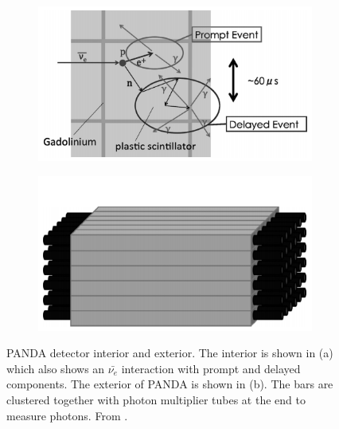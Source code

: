 \begin{figure}[!h]
\centering
\begin{subfigure}{.5\textwidth}
  \centering
\includegraphics[width=\linewidth]{Chapter2/Figs/Raster/Panda_close.png}
  \captionsetup{width=.9\linewidth}
  \caption{}
  \label{subFig:pandaClose}
\end{subfigure}%
\begin{subfigure}{.5\textwidth}
  \centering
  \includegraphics[width=\linewidth]{Chapter2/Figs/Raster/Panda_far.png}
  \captionsetup{width=.9\linewidth}
  \caption{}
  \label{subFig:pandaFar}
\end{subfigure}
\caption{PANDA detector interior and exterior. The interior is shown in (a) which also shows an $\bar{\nu_e}$ interaction with prompt and delayed components. The exterior of PANDA is shown in (b). The bars are clustered together with photon multiplier tubes at the end to measure photons. From \cite{PANDA_2014}.}
\label{fig:pandaCloseFar}
\end{figure}

